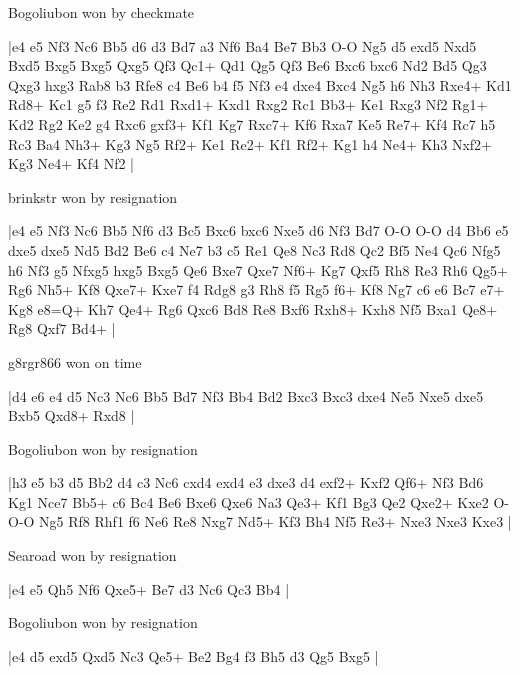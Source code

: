 \showboard

Bogoliubon won by checkmate

\makegametitle
|e4 e5 Nf3 Nc6 Bb5 d6 d3 Bd7 a3 Nf6 Ba4 Be7 Bb3 O-O Ng5 d5 exd5 Nxd5 Bxd5 Bxg5 Bxg5 Qxg5 Qf3 Qc1+ Qd1 Qg5 Qf3 Be6 Bxc6 bxc6 Nd2 Bd5 Qg3 Qxg3 hxg3 Rab8 b3 Rfe8 c4 Be6 b4 f5 Nf3 e4 dxe4 Bxc4 Ng5 h6 Nh3 Rxe4+ Kd1 Rd8+ Kc1 g5 f3 Re2 Rd1 Rxd1+ Kxd1 Rxg2 Rc1 Bb3+ Ke1 Rxg3 Nf2 Rg1+ Kd2 Rg2 Ke2 g4 Rxc6 gxf3+ Kf1 Kg7 Rxc7+ Kf6 Rxa7 Ke5 Re7+ Kf4 Rc7 h5 Rc3 Ba4 Nh3+ Kg3 Ng5 Rf2+ Ke1 Re2+ Kf1 Rf2+ Kg1 h4 Ne4+ Kh3 Nxf2+ Kg3 Ne4+ Kf4 Nf2  |

\showboard

brinkstr won by resignation

\makegametitle
|e4 e5 Nf3 Nc6 Bb5 Nf6 d3 Bc5 Bxc6 bxc6 Nxe5 d6 Nf3 Bd7 O-O O-O d4 Bb6 e5 dxe5 dxe5 Nd5 Bd2 Be6 c4 Ne7 b3 c5 Re1 Qe8 Nc3 Rd8 Qc2 Bf5 Ne4 Qc6 Nfg5 h6 Nf3 g5 Nfxg5 hxg5 Bxg5 Qe6 Bxe7 Qxe7 Nf6+ Kg7 Qxf5 Rh8 Re3 Rh6 Qg5+ Rg6 Nh5+ Kf8 Qxe7+ Kxe7 f4 Rdg8 g3 Rh8 f5 Rg5 f6+ Kf8 Ng7 c6 e6 Bc7 e7+ Kg8 e8=Q+ Kh7 Qe4+ Rg6 Qxc6 Bd8 Re8 Bxf6 Rxh8+ Kxh8 Nf5 Bxa1 Qe8+ Rg8 Qxf7 Bd4+  |

\showboard

g8rgr866 won on time

\makegametitle
|d4 e6 e4 d5 Nc3 Nc6 Bb5 Bd7 Nf3 Bb4 Bd2 Bxc3 Bxc3 dxe4 Ne5 Nxe5 dxe5 Bxb5 Qxd8+ Rxd8  |

\showboard

Bogoliubon won by resignation

\makegametitle
|h3 e5 b3 d5 Bb2 d4 c3 Nc6 cxd4 exd4 e3 dxe3 d4 exf2+ Kxf2 Qf6+ Nf3 Bd6 Kg1 Nce7 Bb5+ c6 Bc4 Be6 Bxe6 Qxe6 Na3 Qe3+ Kf1 Bg3 Qe2 Qxe2+ Kxe2 O-O-O Ng5 Rf8 Rhf1 f6 Ne6 Re8 Nxg7 Nd5+ Kf3 Bh4 Nf5 Re3+ Nxe3 Nxe3 Kxe3  |

\showboard

Searoad won by resignation

\makegametitle
|e4 e5 Qh5 Nf6 Qxe5+ Be7 d3 Nc6 Qc3 Bb4  |

\showboard

Bogoliubon won by resignation

\makegametitle
|e4 d5 exd5 Qxd5 Nc3 Qe5+ Be2 Bg4 f3 Bh5 d3 Qg5 Bxg5  |

